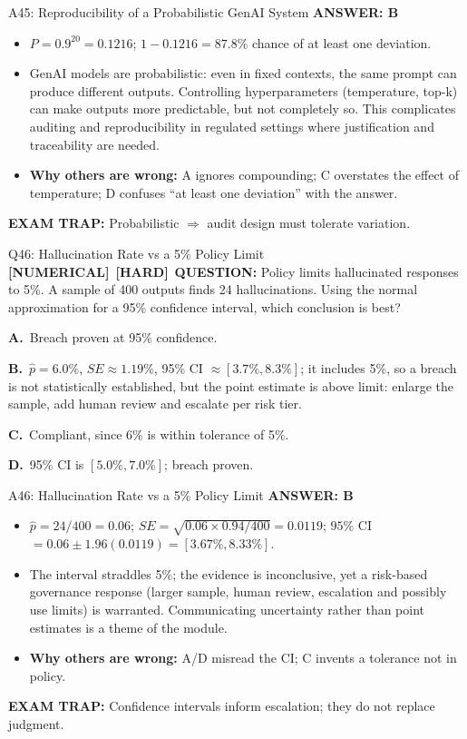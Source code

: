 \documentclass[8pt]{beamer}
\newcommand{\fs}{\fontsize{10}{12}\selectfont}
\newcommand{\opts}[4]{\par\vspace{0.12cm}\noindent\textbf{A.}~#1\par\vspace{0.08cm}\noindent\textbf{B.}~#2\par\vspace{0.08cm}\noindent\textbf{C.}~#3\par\vspace{0.08cm}\noindent\textbf{D.}~#4\par}
\newcommand{\ans}[1]{\textcolor{myblue}{\textbf{ANSWER: #1}}}
\newcommand{\trap}[1]{\textcolor{myred}{\textbf{EXAM TRAP:}} #1}
\newcommand{\numtag}{\textcolor{mypurple}{\textbf{[NUMERICAL]}}}
\newcommand{\hard}{\textcolor{myorange}{\textbf{[HARD]}}}
\begin{document}
\begin{frame}[t]{A45: Reproducibility of a Probabilistic GenAI System}
\fs
\ans{B}
\begin{itemize}
\item $P=0.9^{20}=\mathbf{0.1216}$; $1-0.1216=87.8\%$ chance of at least one deviation.
\item GenAI models are probabilistic: even in fixed contexts, the same prompt can produce different outputs. Controlling hyperparameters (temperature, top-k) can make outputs more predictable, but not completely so. This complicates auditing and reproducibility in regulated settings where justification and traceability are needed.
\item \textbf{Why others are wrong:} A ignores compounding; C overstates the effect of temperature; D confuses ``at least one deviation'' with the answer.
\end{itemize}
\trap{Probabilistic $\Rightarrow$ audit design must tolerate variation.}
\end{frame}

\begin{frame}[t]{Q46: Hallucination Rate vs a 5\% Policy Limit}
\fs
\numtag\ \hard\ \textbf{QUESTION:} Policy limits hallucinated responses to 5\%. A sample of 400 outputs finds 24 hallucinations. Using the normal approximation for a 95\% confidence interval, which conclusion is best?
\opts{Breach proven at 95\% confidence.}
{$\hat p=6.0\%$, $SE\approx1.19\%$, 95\% CI $\approx[3.7\%,8.3\%]$; it includes 5\%, so a breach is not statistically established, but the point estimate is above limit: enlarge the sample, add human review and escalate per risk tier.}
{Compliant, since 6\% is within tolerance of 5\%.}
{95\% CI is $[5.0\%,7.0\%]$; breach proven.}
\end{frame}

\begin{frame}[t]{A46: Hallucination Rate vs a 5\% Policy Limit}
\fs
\ans{B}
\begin{itemize}
\item $\hat p=24/400=0.06$; $SE=\sqrt{0.06\times0.94/400}=0.0119$; $95\%$ CI $=0.06\pm1.96(0.0119)=[3.67\%,8.33\%]$.
\item The interval straddles 5\%; the evidence is inconclusive, yet a risk-based governance response (larger sample, human review, escalation and possibly use limits) is warranted. Communicating uncertainty rather than point estimates is a theme of the module.
\item \textbf{Why others are wrong:} A/D misread the CI; C invents a tolerance not in policy.
\end{itemize}
\trap{Confidence intervals \textcolor{myblue}{inform} escalation; they do not replace judgment.}
\end{frame}
\end{document}
